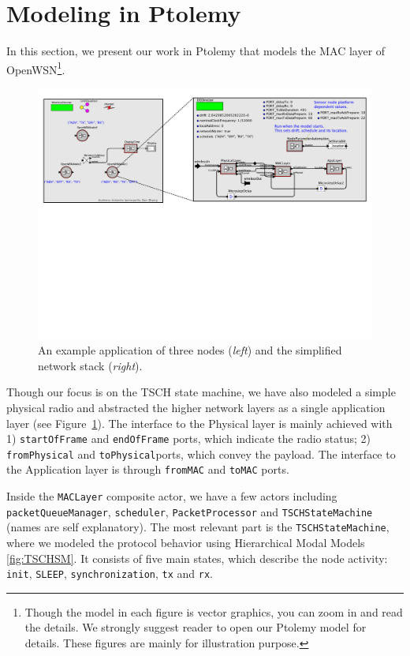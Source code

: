 
\section{Modeling in Ptolemy}
\label{sec:modeling-ptolemy}

In this section, we present our work in Ptolemy that models the MAC layer of OpenWSN\footnote{Though the model in each figure is vector graphics, you can zoom in and read the details. We strongly suggest reader to open our Ptolemy model for details. These figures are mainly for illustration purpose.}.

\begin{figure}[t]
\centering
\includegraphics[width=1\columnwidth]{figures/PaperOpenWSNNode}
\caption{An example application of three nodes ({\em left}) and the simplified network stack ({\em right}).}
\label{fig:OpenWSNNode}
\end{figure}

Though our focus is on the TSCH state machine, we have also modeled a simple physical radio and abstracted the higher network layers as a single application layer (see Figure~\ref{fig:OpenWSNNode}). The interface to the Physical layer is mainly achieved with 1) \texttt{startOfFrame} and \texttt{endOfFrame} ports, which indicate the radio status; 2) \texttt{fromPhysical} and \texttt{toPhysical}ports, which convey the payload. The interface to the Application layer is through \texttt{fromMAC} and \texttt{toMAC} ports. 

Inside the \texttt{MACLayer} composite actor, we have a few actors including \texttt{packetQueueManager}, \texttt{scheduler}, \texttt{PacketProcessor} and \texttt{TSCHStateMachine} (names are self explanatory). The most relevant part is the \texttt{TSCHStateMachine}, where we modeled the protocol behavior using Hierarchical Modal Models \ref{fig:TSCHSM}. It consists of five main states, which describe the node activity: \texttt{init}, \texttt{SLEEP}, \texttt{synchronization}, \texttt{tx} and \texttt{rx}. 


